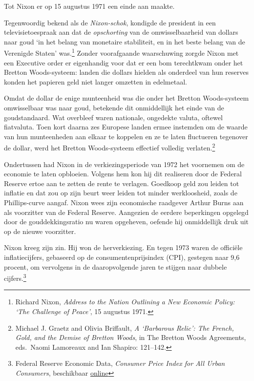 \documentclass[
  a5paper,
  smalldemyvopaper,11pt,twoside,onecolumn,openright,extrafontsizes,
hidelinks]{memoir}
\begin{document}
Tot Nixon er op 15 augustus 1971 een einde aan maakte.

Tegenwoordig bekend als de \emph{Nixon-schok}, kondigde de president in
een televisietoespraak aan dat de \emph{opschorting} van de
omwisselbaarheid van dollars naar goud `in het belang van monetaire
stabiliteit, en in het beste belang van de Verenigde Staten'
was.\footnote{\hspace{0pt}Richard Nixon, \emph{Address to the Nation
  Outlining a New Economic Policy: `The Challenge of Peace'}, 15
  augustus 1971.} Zonder voorafgaande waarschuwing zorgde Nixon met een
Executive order er eigenhandig voor dat er een bom terechtkwam onder het
Bretton Woods-systeem: landen die dollars hielden als onderdeel van hun
reserves konden het papieren geld niet langer omzetten in edelmetaal.

Omdat de dollar de enige munteenheid was die onder het Bretton
Woods-systeem omwisselbaar was naar goud, betekende dit onmiddellijk het
einde van de goudstandaard. Wat overbleef waren nationale, ongedekte
valuta, oftewel fiatvaluta. Toen kort daarna zes Europese landen ermee
instemden om de waarde van hun munteenheden aan elkaar te koppelen en ze
te laten fluctueren tegenover de dollar, werd het Bretton Woods-systeem
effectief volledig verlaten.\footnote{\hspace{0pt}Michael J. Graetz and
  Olivia Briffault, \emph{A `Barbarous Relic': The French, Gold, and the
  Demise of Bretton Woods}, in The Bretton Woods Agreements, eds.~Naomi
  Lamoreaux and Ian Shapiro: 121--142.}

Ondertussen had Nixon in de verkiezingsperiode van 1972 het voornemen om
de economie te laten opbloeien. Volgens hem kon hij dit realiseren door
de Federal Reserve ertoe aan te zetten de rente te verlagen. Goedkoop
geld zou leiden tot inflatie en dat zou op zijn beurt weer leiden tot
minder werkloosheid, zoals de Phillips-curve aangaf. Nixon wees zijn
economische raadgever Arthur Burns aan als voorzitter van de Federal
Reserve. Aangezien de eerdere beperkingen opgelegd door de
gouddekkingsratio nu waren opgeheven, oefende hij onmiddellijk druk uit
op de nieuwe voorzitter.

Nixon kreeg zijn zin. Hij won de herverkiezing. En tegen 1973 waren de
officiële inflatiecijfers, gebaseerd op de consumentenprijsindex (CPI),
gestegen naar 9,6 procent, om vervolgens in de daaropvolgende jaren te
stijgen naar dubbele cijfers.\footnote{Federal Reserve Economic Data,
  \emph{Consumer Price Index for All Urban Consumers}, beschikbaar
  \href{https://fred.stlouisfed.org/series/CPIAUCSL}{online}}
\end{document}
